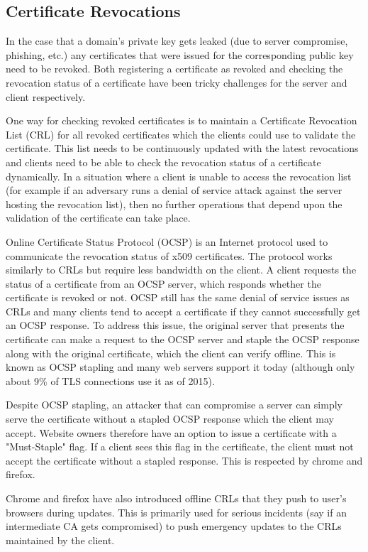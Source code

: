 \subsection{Certificate Revocations}
In the case that a domain's private key gets leaked (due to server compromise,
phishing, etc.) any certificates that were issued for the corresponding public
key need to be revoked. Both registering a certificate as revoked and checking
the revocation status of a certificate have been tricky challenges for the
server and client respectively.

One way for checking revoked certificates is to maintain a Certificate
Revocation List (CRL) for all revoked certificates which the clients could use
to validate the certificate. This list needs to be continuously updated with
the latest revocations and clients need to be able to check the revocation
status of a certificate dynamically. In a situation where a client is unable to
access the revocation list (for example if an adversary runs a denial of
service attack against the server hosting the revocation list), then no further
operations that depend upon the validation of the certificate can take place.

Online Certificate Status Protocol (OCSP) is an Internet protocol used to
communicate the revocation status of x509 certificates. The protocol works
similarly to CRLs but require less bandwidth on the client. A client requests
the status of a certificate from an OCSP server, which responds whether the
certificate is revoked or not. OCSP still has the same denial of service issues
as CRLs and many clients tend to accept a certificate if they cannot
successfully get an OCSP response. To address this issue, the original server
that presents the certificate can make a request to the OCSP server and staple
the OCSP response along with the original certificate, which the client can
verify offline. This is known as OCSP stapling and many web servers support it
today (although only about 9\% of TLS connections use it as of 2015).

Despite OCSP stapling, an attacker that can compromise a server can simply
serve the certificate without a stapled OCSP response which the client may
accept. Website owners therefore have an option to issue a certificate with a
"Must-Staple" flag. If a client sees this flag in the certificate, the client
must not accept the certificate without a stapled response. This is respected
by chrome and firefox.

Chrome and firefox have also introduced offline CRLs that they push to user's
browsers during updates. This is primarily used for serious incidents (say if
an intermediate CA gets compromised) to push emergency updates to the CRLs
maintained by the client.


